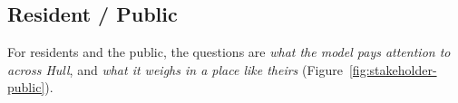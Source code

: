 \newsavebox{\cardbox}
\newlength{\cardheight}
\newlength{\cardbesth}
\providecommand{\cardtrialh}{5cm}
\providecommand{\cardminfigh}{5.5cm}
\providecommand{\setcard}{\sbox{\cardbox}{\begin{minipage}{\linewidth}\cardcontent\end{minipage}}%
  \setlength{\cardheight}{\dimexpr\ht\cardbox+\dp\cardbox\relax}%
  \ifdim\cardheight>\cardavail\else\ifdim\cardfigh>\cardbesth\setlength{\cardbesth}{\cardfigh}\fi\fi}
\providecommand{\fitstep}[1]{\setlength{\cardfigh}{\dimexpr\cardfigh+(\cardavail-\cardheight)/#1\relax}%
  \ifdim\cardfigh<2.5cm\setlength{\cardfigh}{2.5cm}\fi\ifdim\cardfigh>\cardavail\setlength{\cardfigh}{\cardavail}\fi
  \setcard}
\providecommand{\fitpass}[1]{\setlength{\cardbesth}{0pt}\setlength{\cardfigh}{\cardtrialh}\setcard
  \fitstep{#1}\fitstep{#1}\fitstep{#1}\fitstep{#1}\fitstep{#1}\fitstep{#1}%
  \ifdim\cardbesth>0pt\setlength{\cardfigh}{\cardbesth}\setcard\fi}
\providecommand{\fitcard}[1]{\edef\cardtilebase{\cardtilegroup}%
  \def\cardfont{\normalsize}\edef\cardtilegroup{\cardtilebase-n}\fitpass{#1}%
  \ifdim\cardbesth<\cardminfigh\def\cardfont{\small}\edef\cardtilegroup{\cardtilebase-s}\fitpass{#1}\fi
  \ifdim\cardbesth<\cardminfigh\def\cardfont{\footnotesize}\edef\cardtilegroup{\cardtilebase-f}\fitpass{#1}\fi
  {\centering\ifdim\cardheight>\cardavail\resizebox*{!}{\cardavail}{\usebox{\cardbox}}\else\usebox{\cardbox}\fi\par}}
\providecommand{\cardHeadline}{[headline]}
\providecommand{\cardSecA}{[section 01]}
\providecommand{\cardSecB}{[section 02]}
\providecommand{\cardFooter}{[footer]}
\providecommand{\cardModel}{[model]}
\providecommand{\cardTileA}{\tile{--}{--}}
\providecommand{\cardTileB}{\tile{--}{--}}
\providecommand{\cardTileC}{\tile{--}{--}}
\providecommand{\cardTileD}{\tile{--}{--}}


\clearpage

\subsection{Resident / Public}
For residents and the public, the questions are \emph{what the model pays attention to across
Hull}, and \emph{what it weighs in a place like theirs} (Figure~\ref{fig:stakeholder-public}).\par\medskip
\def\cardtilegroup{publictiles}
\measurecard

